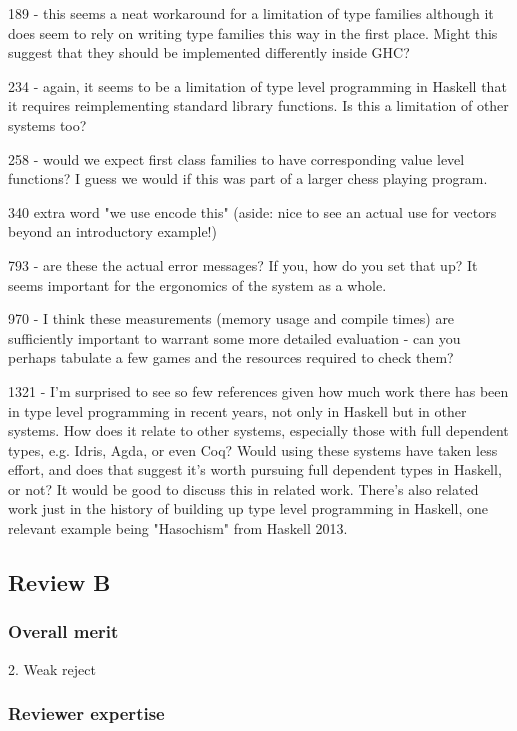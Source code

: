 189 - this seems a neat workaround for a limitation of type families although it does seem to rely on writing type families this way in the first place. Might this suggest that they should be implemented differently inside GHC?

234 - again, it seems to be a limitation of type level programming in Haskell that it requires reimplementing standard library functions. Is this a limitation of other systems too?

258 - would we expect first class families to have corresponding value level functions? I guess we would if this was part of a larger chess playing program.

340 extra word "we use encode this" (aside: nice to see an actual use for vectors beyond an introductory example!)

793 - are these the actual error messages? If you, how do you set that up? It seems important for the ergonomics of the system as a whole.

970 - I think these measurements (memory usage and compile times) are sufficiently important to warrant some more detailed evaluation - can you perhaps tabulate a few games and the resources required to check them?

1321 - I'm surprised to see so few references given how much work there has been in type level programming in recent years, not only in Haskell but in other systems. How does it relate to other systems, especially those with full dependent types, e.g. Idris, Agda, or even Coq? Would using these systems have taken less effort, and does that suggest it's worth pursuing full dependent types in Haskell, or not? It would be good to discuss this in related work. There's also related work just in the history of building up type level programming in Haskell, one relevant example being "Hasochism" from Haskell 2013.

\subsection{Review B}

\subsubsection{Overall merit}

2. Weak reject

\subsubsection{Reviewer expertise}

